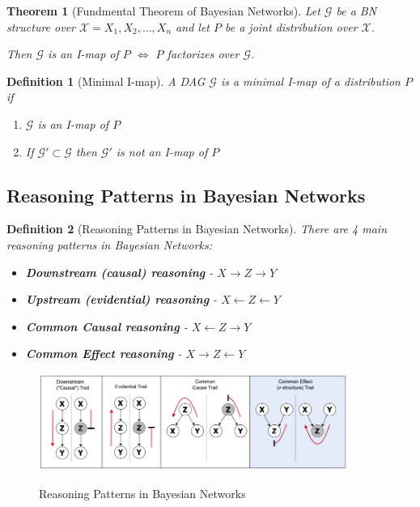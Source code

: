\documentclass[11pt]{article}
\numberwithin{equation}{section}
\theoremstyle{boldStyle}
\theoremstyle{boldBlueStyle}
\theoremstyle{boldPurpleStyle}
\newtheorem{theorem}{Theorem}[section]
\theoremstyle{boldRedStyle}
\newtheorem{definition}{Definition}[section]
\begin{document}
\begin{theorem}[Fundmental Theorem of Bayesian Networks]
    Let $\mathcal{G}$ be a BN structure over $\mathcal{X} = {X_1, X_2, \ldots, X_n}$ and let $P$ be a joint distribution over $\mathcal{X}$. 
    
    Then $\mathcal{G}$ is an I-map of $P$ $\Leftrightarrow$ $P$ factorizes over $\mathcal{G}$.
\end{theorem}

\begin{definition}[Minimal I-map]
    A DAG $\mathcal{G}$ is a minimal I-map of a distribution $P$ if 
    \begin{enumerate}
        \item $\mathcal{G}$ is an I-map of $P$
        \item If $\mathcal{G}' \subset \mathcal{G}$ then $\mathcal{G}'$ is not an I-map of $P$
    \end{enumerate}
\end{definition}


\subsection{Reasoning Patterns in Bayesian Networks}


\begin{definition}[Reasoning Patterns in Bayesian Networks]
    There are 4 main reasoning patterns in Bayesian Networks:
    \begin{itemize}
        \item \textbf{Downstream (causal) reasoning} - $X \rightarrow Z \rightarrow Y$
        \item \textbf{Upstream (evidential) reasoning} - $X \leftarrow Z \leftarrow Y$
        \item \textbf{Common Causal reasoning} - $X \leftarrow Z \rightarrow Y$
        \item \textbf{Common Effect reasoning} - $X \rightarrow Z \leftarrow Y$
    \end{itemize}
\end{definition}

\begin{figure}[H]
    \centering 
    \includegraphics[width=0.9\textwidth]{figs/reasoning_in_BN.png}
    \label{fig:reasoning_in_BN}
    \caption{Reasoning Patterns in Bayesian Networks}
\end{figure}
\end{document}

